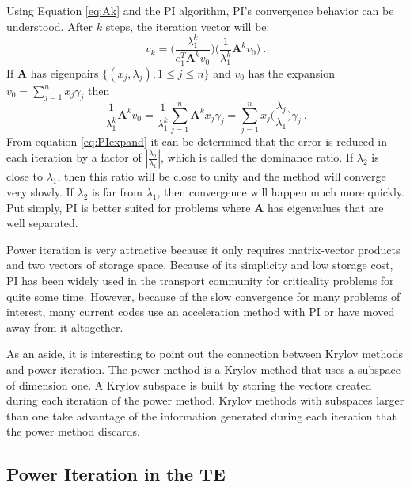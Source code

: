 \documentclass[12pt]{article}
\newcommand{\ve}[1]{\ensuremath{\mathbf{#1}}}
\begin{document}
Using Equation \eqref{eq:Ak} and the PI algorithm, PI's convergence behavior can be understood. After $k$ steps, the iteration vector will be: 
%
\begin{equation}
  v_{k} = \bigl( \frac{\lambda_{1}^{k}}{e_{1}^{T}\ve{A}^{k}v_{0}} \bigr) \bigl(\frac{1}{\lambda_{1}^{k}}\ve{A}^{k}v_{0} \bigr) \:.
\end{equation}
% 
If $\ve{A}$ has eigenpairs $\{(x_{j}, \lambda_{j}), 1 \le j \le n \}$ and $v_{0}$ has the expansion $v_{0} = \sum_{j=1}^{n} x_{j}\gamma_{j}$ then
%
\begin{equation}
  \frac{1}{\lambda_{1}^{k}}\ve{A}^{k}v_{0} =  \frac{1}{\lambda_{1}^{k}} \sum_{j=1}^{n} \ve{A}^{k}x_{j}\gamma_{j} = \sum_{j=1}^{n} x_{j} \bigl(\frac{\lambda_{j}}{\lambda_{1}} \bigr) \gamma_{j} \:.
  \label{eq:PIexpand}
\end{equation}
%
From equation \eqref{eq:PIexpand} it can be determined that the error is reduced in each iteration by a factor of $|\frac{\lambda_{2}}{\lambda_{1}}|$, which is called the dominance ratio. If $\lambda_2$ is close to $\lambda_1$, then this ratio will be close to unity and the method will converge very slowly. If $\lambda_2$ is far from $\lambda_1$, then convergence will happen much more quickly. Put simply, PI is better suited for problems where $\ve{A}$ has eigenvalues that are well separated.%

Power iteration is very attractive because it only requires matrix-vector products and two vectors of storage space. Because of its simplicity and low storage cost, PI has been widely used in the transport community for criticality problems for quite some time. %
However, because of the slow convergence for many problems of interest, many current codes use an acceleration method with PI or have moved away from it altogether. 

As an aside, it is interesting to point out the connection between Krylov methods and power iteration. The power method is a Krylov method that uses a subspace of dimension one.  A Krylov subspace is built by storing the vectors created during each iteration of the power method. Krylov methods with subspaces larger than one take advantage of the information generated during each iteration that the power method discards. 

\subsection*{Power Iteration in the TE}
\end{document}
